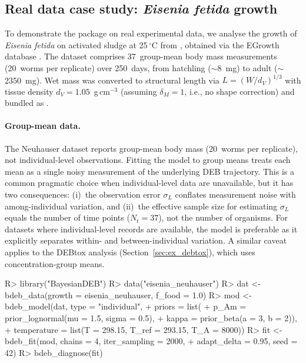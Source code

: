 \documentclass[article,shortnames]{jss}
\begin{document}
\subsection[Real data case study]{Real data case study:
  \emph{Eisenia fetida} growth} \label{sec:realdata}

To demonstrate the package on real experimental data, we analyse
the growth of \emph{Eisenia fetida} on activated sludge at 25\,$^\circ$C
from \citet{Neuhauser1980}, obtained via the EGrowth database
\citep{MathieuEGrowth2018}.  The dataset comprises 37~group-mean
body mass measurements (20~worms per replicate) over 250~days, from
hatchling ($\sim$8~mg) to adult ($\sim$2350~mg).  Wet mass was
converted to structural length via $L = (W / d_V)^{1/3}$ with tissue
density $d_V = 1.05$~g\,cm$^{-3}$ (assuming $\delta_M = 1$, i.e., no
shape correction) and bundled as .

\paragraph{Group-mean data.}
The Neuhauser dataset reports group-mean body mass (20~worms per
replicate), not individual-level observations.  Fitting the
 model to group means treats each mean as a
single noisy measurement of the underlying DEB trajectory.  This is
a common pragmatic choice when individual-level data are unavailable,
but it has two consequences: (i)~the observation error $\sigma_L$
conflates measurement noise with among-individual variation, and
(ii)~the effective sample size for estimating $\sigma_L$ equals the
number of time points ($N_t = 37$), not the number of organisms.
For datasets where individual-level records are available, the
 model is preferable as it explicitly separates
within- and between-individual variation.  A similar caveat applies
to the DEBtox analysis (Section~\ref{sec:ex_debtox}), which uses
concentration-group means.

\begin{CodeChunk}
\begin{CodeInput}
R> library("BayesianDEB")
R> data("eisenia_neuhauser")
R> dat <- bdeb_data(growth = eisenia_neuhauser, f_food = 1.0)
R> mod <- bdeb_model(dat, type = "individual",
+    priors = list(
+      p_Am  = prior_lognormal(mu = 1.5, sigma = 0.5),
+      kappa = prior_beta(a = 3, b = 2)),
+    temperature = list(T = 298.15, T_ref = 293.15, T_A = 8000))
R> fit <- bdeb_fit(mod, chains = 4, iter_sampling = 2000,
+    adapt_delta = 0.95, seed = 42)
R> bdeb_diagnose(fit)
\end{CodeInput}
\end{CodeChunk}
\end{document}
